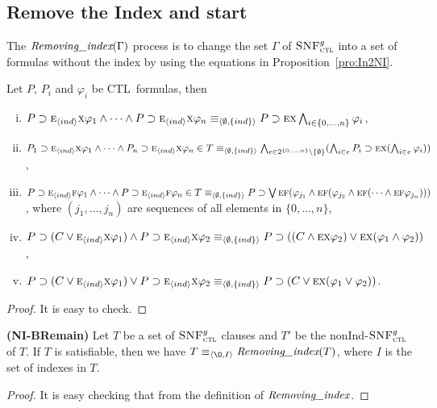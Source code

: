 \documentclass[runningheads]{llncs}
\newcommand{\tuple}[1]{{\langle{#1}\rangle}}
\newcommand{\Mod}{\textit{Mod}}
\newcommand{\lrto}{\leftrightarrow}
\newcommand{\Hm} {{\cal M}}
\newcommand{\start}{\textbf{start}}
\newcommand{\CTL}{\textrm{CTL}}
\newcommand{\EXIST}{\textsc{e}}
\newcommand{\NEXT}{\textsc{x}}
\newcommand{\FUTURE}{\textsc{f}}
\newcommand{\CTLsnf}{{\textsc{SNF}_{\textsc{ctl}}^g}}
\begin{document}
\subsection{Remove the Index and \start}
The $\emph{Removing\_index}(\Gamma)$ process is to change the set $\Gamma$ of $\CTLsnf$ into a set of formulas without the index by using the equations in Proposition~\ref{pro:In2NI}.
\begin{proposition}\label{pro:In2NI}
Let $P$, $P_i$ and $\varphi_i$ be \CTL\ formulas, then
\begin{enumerate}[(i)]
  \item $P\supset \EXIST_{\tuple{ind}} \NEXT \varphi_1 \wedge \dots \wedge P\supset \EXIST_{\tuple{ind}}\NEXT \varphi_n  \equiv_{\tuple{\emptyset, \{ind\}}} P\supset \EXIST \NEXT \bigwedge_{i\in \{0,\dots, n\}}\varphi_i$,
  \item $P_1\supset \EXIST_{\tuple{ind}} \NEXT \varphi_1 \wedge \dots \wedge P_n\supset \EXIST_{\tuple{ind}}\NEXT \varphi_n \in T \equiv_{\tuple{\emptyset, \{ind\}}} \bigwedge_{e \in 2^{\{0,\dots, n\}} \setminus \{\emptyset\}}(\bigwedge_{i\in e}P_i\supset \EXIST \NEXT (\bigwedge_{i\in e}\varphi_i))$,
  \item $P\supset \EXIST_{\tuple{ind}} \FUTURE \varphi_1 \wedge \dots \wedge P\supset \EXIST_{\tuple{ind}} \FUTURE \varphi_n \in T \equiv_{\tuple{\emptyset, \{ind\}}} P\supset \bigvee\EXIST\FUTURE (\varphi_{j_1} \wedge \EXIST\FUTURE(\varphi_{j_2} \wedge \EXIST\FUTURE(\dots \wedge \EXIST\FUTURE \varphi_{j_n})))$, where $(j_1, \dots, j_n)$ are sequences of all elements in $\{0, \dots, n\}$,
  \item $P\supset (C \vee \EXIST_{\tuple{ind}} \NEXT \varphi_1) \wedge P \supset \EXIST_{\tuple{ind}} \NEXT \varphi_2 \equiv_{\tuple{\emptyset, \{ind\}}} P \supset ((C \wedge \EXIST \NEXT \varphi_2) \vee \EXIST \NEXT (\varphi_1 \wedge \varphi_2))$,
  \item $P\supset (C \vee \EXIST_{\tuple{ind}} \NEXT \varphi_1) \vee P \supset \EXIST_{\tuple{ind}} \NEXT \varphi_2 \equiv_{\tuple{\emptyset, \{ind\}}} P \supset (C \vee \EXIST \NEXT (\varphi_1 \vee \varphi_2))$.
\end{enumerate}
\end{proposition}
\begin{proof}
It is easy to check.
\end{proof}

\begin{lemma}\label{lem:No:Ind}
\textbf{(NI-BRemain)}
Let $T$ be a set of $\CTLsnf$ clauses and $T'$ be the nonInd-$\CTLsnf$ of $T$.
If $T$ is satisfiable, then we have $T \equiv_{\tuple{{\O}, I}} \emph{Removing\_index}(T)$,
where $I$ is the set of indexes in $T$.
\end{lemma}
\begin{proof}
It is easy checking that from the definition of $\emph{Removing\_index}$.
\end{proof}
\end{document}
